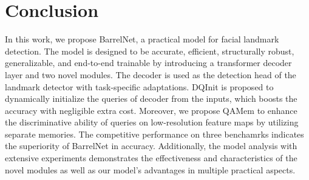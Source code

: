 \documentclass{article}
\begin{document}
\section{Conclusion}
\label{sec:6}

In this work, we propose BarrelNet, a practical model for facial landmark detection. The model is designed to be accurate, efficient, structurally robust, generalizable, and end-to-end trainable by introducing a transformer decoder layer and two novel modules. The decoder is used as the detection head of the landmark detector with task-specific adaptations. DQInit is proposed to dynamically initialize the queries of decoder from the inputs, which boosts the accuracy with negligible extra cost. Moreover, we propose QAMem to enhance the discriminative ability of queries on low-resolution feature maps by utilizing separate memories. The competitive performance on three benchamrks indicates the superiority of BarrelNet in accuracy. Additionally, the model analysis with extensive experiments demonstrates the effectiveness and characteristics of the novel modules as well as our model's advantages in multiple practical aspects.




{\small


}
\end{document}
